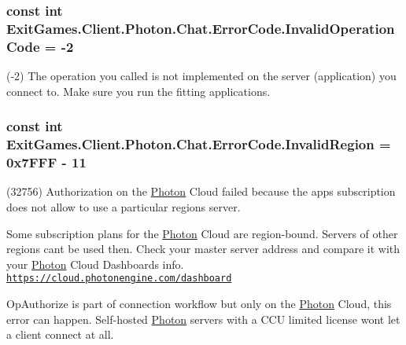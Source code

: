 \subsubsection[{\texorpdfstring{Invalid\+Operation\+Code}{InvalidOperationCode}}]{\setlength{\rightskip}{0pt plus 5cm}const int Exit\+Games.\+Client.\+Photon.\+Chat.\+Error\+Code.\+Invalid\+Operation\+Code = -\/2}\hypertarget{class_exit_games_1_1_client_1_1_photon_1_1_chat_1_1_error_code_a83ca01ddd4c0f0dd69c9ae9d135716dc}{}\label{class_exit_games_1_1_client_1_1_photon_1_1_chat_1_1_error_code_a83ca01ddd4c0f0dd69c9ae9d135716dc}


(-\/2) The operation you called is not implemented on the server (application) you connect to. Make sure you run the fitting applications.

\subsubsection[{\texorpdfstring{Invalid\+Region}{InvalidRegion}}]{\setlength{\rightskip}{0pt plus 5cm}const int Exit\+Games.\+Client.\+Photon.\+Chat.\+Error\+Code.\+Invalid\+Region = 0x7\+F\+F\+F -\/ 11}\hypertarget{class_exit_games_1_1_client_1_1_photon_1_1_chat_1_1_error_code_af2c3cf51125257fba0d2d9f76cbb55f1}{}\label{class_exit_games_1_1_client_1_1_photon_1_1_chat_1_1_error_code_af2c3cf51125257fba0d2d9f76cbb55f1}


(32756) Authorization on the \hyperlink{namespace_exit_games_1_1_client_1_1_photon}{Photon} Cloud failed because the app\textquotesingle{}s subscription does not allow to use a particular region\textquotesingle{}s server. 

Some subscription plans for the \hyperlink{namespace_exit_games_1_1_client_1_1_photon}{Photon} Cloud are region-\/bound. Servers of other regions can\textquotesingle{}t be used then. Check your master server address and compare it with your \hyperlink{namespace_exit_games_1_1_client_1_1_photon}{Photon} Cloud Dashboard\textquotesingle{}s info. \href{https://cloud.photonengine.com/dashboard}{\tt https\+://cloud.\+photonengine.\+com/dashboard}

Op\+Authorize is part of connection workflow but only on the \hyperlink{namespace_exit_games_1_1_client_1_1_photon}{Photon} Cloud, this error can happen. Self-\/hosted \hyperlink{namespace_exit_games_1_1_client_1_1_photon}{Photon} servers with a C\+CU limited license won\textquotesingle{}t let a client connect at all. 
